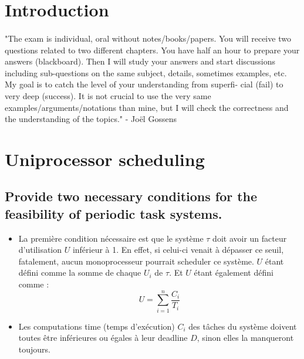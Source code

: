 \begin{titlepage}

\vfill %

\end{titlepage}

\tableofcontents
\newpage
\section{Introduction}
    \paragraph{}
    "The exam is individual, oral without notes/books/papers. You will
    receive two questions related to two different chapters. You have
    half an hour to prepare your answers (blackboard). Then I will
    study your answers and start discussions including sub-questions
    on the same subject, details, sometimes examples, etc.
    My goal is to catch the level of your understanding from superfi-
    cial (fail) to very deep (success). It is not crucial to use the very
    same examples/arguments/notations than mine, but I will check the
    correctness and the understanding of the topics." - Joël Gossens
\section{Uniprocessor scheduling}
\subsection{Provide two necessary conditions for the feasibility of periodic task systems.}
\begin{itemize}

  \item La première condition nécessaire est que le système $\tau$ doit avoir un facteur
        d'utilisation $U$ inférieur à 1. 
   		En effet, si celui-ci venait à dépasser ce seuil, fatalement, aucun monoprocesseur 
        pourrait scheduler ce système. $U$ étant défini comme la somme de chaque $U_{i}$ de 
        $\tau$. Et $U$ étant également défini comme  : 
        \begin{equation}
          U = \sum\limits_{i=1}^n \frac{C_{i}}{T_{i}}
        \end{equation}        
   \item Les computations time (temps d'exécution) $C_{i}$ des tâches du système doivent 
   		 toutes être inférieures ou égales à leur deadline $D$, sinon elles la manqueront
         toujours. 
         
\end{itemize}

